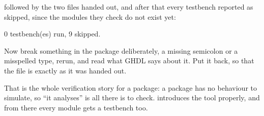 followed by the two  files handed out, and after that every testbench reported as
skipped, since the modules they check do not exist yet:

\begin{console}
0 testbench(es) run, 9 skipped.
\end{console}

Now break something in the package deliberately, a missing semicolon or a misspelled type, rerun,
and read what GHDL says about it. Put it back, so that the file is exactly as it was handed out.

That is the whole verification story for a package: a package has no behaviour to simulate, so ``it
analyses'' is all there is to check.  introduces the tool properly, and from there
every module gets a testbench too.
